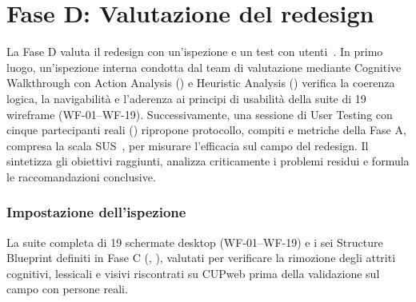 
\newcommand{\pw}[2]{\dimexpr(\linewidth-#1\tabcolsep)*#2/100\relax}

\chapter{Fase D: Valutazione del redesign}

La Fase D valuta il redesign con un'ispezione e un test con utenti~\cite{iso9241210_2010}. In primo luogo, un'ispezione interna condotta dal team di valutazione mediante Cognitive Walkthrough con Action Analysis () e Heuristic Analysis () verifica la coerenza logica, la navigabilità e l'aderenza ai principi di usabilità della suite di 19 wireframe (WF-01--WF-19). Successivamente, una sessione di User Testing con cinque partecipanti reali () ripropone protocollo, compiti e metriche della Fase A, compresa la scala SUS~\cite{sauroSUS2011}, per misurare l'efficacia sul campo del redesign. Il  sintetizza gli obiettivi raggiunti, analizza criticamente i problemi residui e formula le raccomandazioni conclusive.

\label{doc:d:02a}

\subsection{Impostazione dell'ispezione}


La suite completa di 19 schermate desktop (WF-01--WF-19) e i sei Structure Blueprint definiti in Fase C (, ), valutati per verificare la rimozione degli attriti cognitivi, lessicali e visivi riscontrati su CUPweb prima della validazione sul campo con persone reali.


